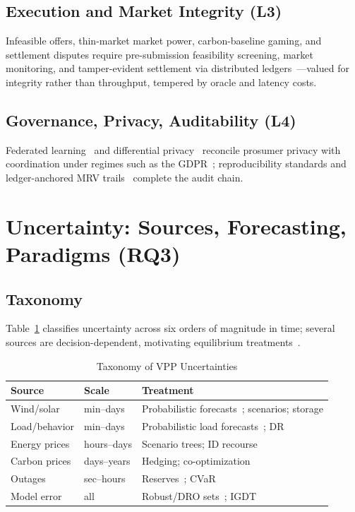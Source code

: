 \documentclass[journal]{IEEEtran}
\begin{document}
\subsection{Execution and Market Integrity (L3)}
Infeasible offers, thin-market market power, carbon-baseline gaming, and settlement disputes require pre-submission feasibility screening, market monitoring, and tamper-evident settlement via distributed ledgers~\cite{andoni2019,nakamoto2008}---valued for integrity rather than throughput, tempered by oracle and latency costs.

\subsection{Governance, Privacy, Auditability (L4)}
Federated learning~\cite{mcmahan2017} and differential privacy~\cite{dwork2006} reconcile prosumer privacy with coordination under regimes such as the GDPR~\cite{gdpr2016}; reproducibility standards and ledger-anchored MRV trails~\cite{andoni2019} complete the audit chain.

\section{Uncertainty: Sources, Forecasting, Paradigms (RQ3)}
\subsection{Taxonomy}
Table~\ref{tab:unc} classifies uncertainty across six orders of magnitude in time; several sources are decision-dependent, motivating equilibrium treatments~\cite{kardakos2016,nash1951}.

\begin{table}[htbp]
\caption{Taxonomy of VPP Uncertainties}
\label{tab:unc}
\centering
\begin{tabular}{p{1.9cm}p{1.1cm}p{4.9cm}}
\toprule
\textbf{Source} & \textbf{Scale} & \textbf{Treatment} \\
\midrule
Wind/solar & min--days & Probabilistic forecasts~\cite{pinson2013}; scenarios; storage \\
Load/behavior & min--days & Probabilistic load forecasts~\cite{hong2016}; DR~\cite{albadi2008} \\
Energy prices & hours--days & Scenario trees; ID recourse~\cite{wozabal2020,silva2022} \\
Carbon prices & days--years & Hedging; co-optimization~\cite{liu2023} \\
Outages & sec--hours & Reserves~\cite{mashhour2011a}; CVaR~\cite{rockafellar2000} \\
Model error & all & Robust/DRO sets~\cite{bertsimas2004,esfahani2018}; IGDT~\cite{benhaim2006} \\
\bottomrule
\end{tabular}
\end{table}
\end{document}
